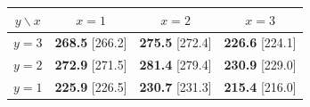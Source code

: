 \begin{tabular}{@{}c|ccc@{}}
\toprule
$y \backslash x$ & $x=1$ & $x=2$ & $x=3$ \\
\midrule
$y=3$ & \textbf{268.5} [266.2] & \textbf{275.5} [272.4] & \textbf{226.6} [224.1] \\
$y=2$ & \textbf{272.9} [271.5] & \textbf{281.4} [279.4] & \textbf{230.9} [229.0] \\
$y=1$ & \textbf{225.9} [226.5] & \textbf{230.7} [231.3] & \textbf{215.4} [216.0] \\
\bottomrule
\end{tabular}
